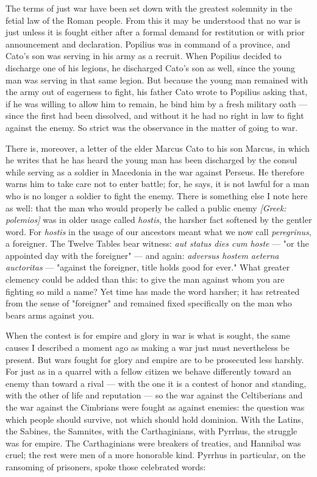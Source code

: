  The terms of just war have been set down with the greatest solemnity in the fetial law of the Roman people. From this it may be understood that no war is just unless it is fought either after a formal demand for restitution or with prior announcement and declaration. Popilius was in command of a province, and Cato's son was serving in his army as a recruit. When Popilius decided to discharge one of his legions, he discharged Cato's son as well, since the young man was serving in that same legion. But because the young man remained with the army out of eagerness to fight, his father Cato wrote to Popilius asking that, if he was willing to allow him to remain, he bind him by a fresh military oath — since the first had been dissolved, and without it he had no right in law to fight against the enemy. So strict was the observance in the matter of going to war.

 There is, moreover, a letter of the elder Marcus Cato to his son Marcus, in which he writes that he has heard the young man has been discharged by the consul while serving as a soldier in Macedonia in the war against Perseus. He therefore warns him to take care not to enter battle; for, he says, it is not lawful for a man who is no longer a soldier to fight the enemy. There is something else I note here as well: that the man who would properly be called a public enemy \textit{[Greek: polemios]} was in older usage called \textit{hostis}, the harsher fact softened by the gentler word. For \textit{hostis} in the usage of our ancestors meant what we now call \textit{peregrinus}, a foreigner. The Twelve Tables bear witness: \textit{aut status dies cum hoste} — "or the appointed day with the foreigner" — and again: \textit{adversus hostem aeterna auctoritas} — "against the foreigner, title holds good for ever." What greater clemency could be added than this: to give the man against whom you are fighting so mild a name? Yet time has made the word harsher; it has retreated from the sense of "foreigner" and remained fixed specifically on the man who bears arms against you.

 When the contest is for empire and glory in war is what is sought, the same causes I described a moment ago as making a war just must nevertheless be present. But wars fought for glory and empire are to be prosecuted less harshly. For just as in a quarrel with a fellow citizen we behave differently toward an enemy than toward a rival — with the one it is a contest of honor and standing, with the other of life and reputation — so the war against the Celtiberians and the war against the Cimbrians were fought as against enemies: the question was which people should survive, not which should hold dominion. With the Latins, the Sabines, the Samnites, with the Carthaginians, with Pyrrhus, the struggle was for empire. The Carthaginians were breakers of treaties, and Hannibal was cruel; the rest were men of a more honorable kind. Pyrrhus in particular, on the ransoming of prisoners, spoke those celebrated words:

